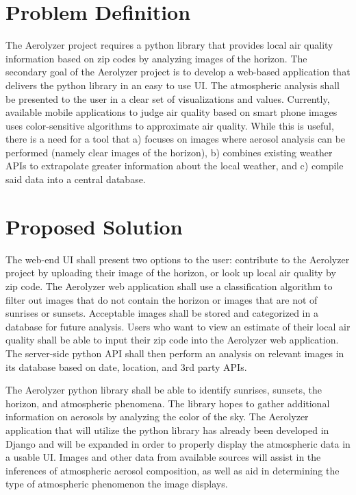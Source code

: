 \documentclass[letterpaper,10pt,draftclsnofoot,onecolumn]{IEEEtran}
\begin{document}
\clearpage
\begin{flushleft}
\section{Problem Definition}
The Aerolyzer project requires a python library that provides local air quality information based on zip codes by analyzing images of the horizon. The secondary goal of the Aerolyzer project is to develop a web-based application that delivers the python library in an easy to use UI. The atmospheric analysis shall be presented to the user in a clear set of visualizations and values. Currently, available mobile applications to judge air quality based on smart phone images uses color-sensitive algorithms to approximate air quality. While this is useful, there is a need for a tool that a) focuses on images where aerosol analysis can be performed (namely clear images of the horizon), b) combines existing weather APIs to extrapolate greater information about the local weather, and c) compile said data into a central database.

\section{Proposed Solution}
The web-end UI shall present two options to the user: contribute to the Aerolyzer project by uploading their image of the horizon, or look up local air quality by zip code. The Aerolyzer web application shall use a classification algorithm to filter out images that do not contain the horizon or images that are not of sunrises or sunsets. Acceptable images shall be stored and categorized in a database for future analysis. Users who want to view an estimate of their local air quality shall be able to input their zip code into the Aerolyzer web application. The server-side python API shall then perform an analysis on relevant images in its database based on date, location, and 3rd party APIs. \par The Aerolyzer python library shall be able to identify sunrises, sunsets, the horizon, and atmospheric phenomena. The library hopes to gather additional information on aerosols by analyzing the color of the sky. The Aerolyzer application that will utilize the python library has already been developed in Django and will be expanded in order to properly display the atmospheric data in a usable UI. Images and other data from available sources will assist in the inferences of atmospheric aerosol composition, as well as aid in determining the type of atmospheric phenomenon the image displays.


\end{flushleft}
\end{document}
